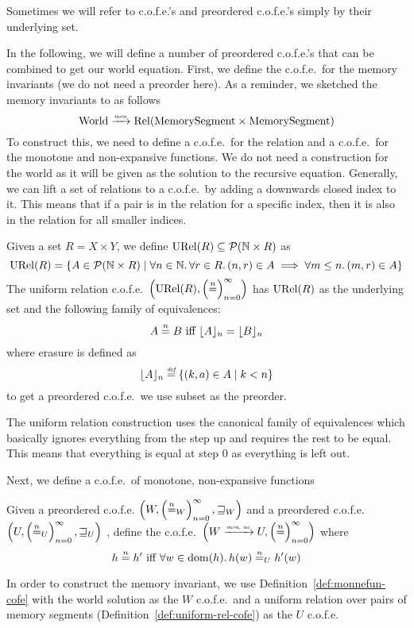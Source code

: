 \begin{jversion}
Sometimes we will refer to c.o.f.e.'s and preordered c.o.f.e.'s simply by their underlying set.

In the following, we will define a number of preordered c.o.f.e.'s that can be combined to get our world equation.
First, we define the c.o.f.e.\ for the memory invariants (we do not need a preorder here).
As a reminder, we sketched the memory invariants to as follows
\[
  \World \monfun \Rel{\MemSeg \times \MemSeg}
\]
To construct this, we need to define a c.o.f.e.\ for the relation and a c.o.f.e.\ for the monotone and non-expansive functions.
We do not need a construction for the world as it will be given as the solution to the recursive equation.
Generally, we can lift a set of relations to a c.o.f.e.\ by adding a downwards closed index to it.
This means that if a pair is in the relation for a specific index, then it is also in the relation for all smaller indices.
\begin{definition}
  \label{def:uniform-rel-cofe}
  Given a set $R = X \times Y$, we define $\URel{R} \subseteq \powerset{\nats \times R}$ as
  \[
    \URel{R} = \{ A \in \powerset{\nats \times R} \mid \forall n \in \nats \ldotp \forall r \in R \ldotp \npair{r} \in A \implies \forall m \leq n \ldotp \npair[m]{r} \in A\}
  \]
  The uniform relation c.o.f.e.\ $\cofe{\URel{R}}$ has $\URel{R}$ as the underlying set and the following family of equivalences:
  \[
    A \nequal B \text{ iff } \erasen{A}{n} = \erasen{B}{n}
  \]
  where erasure is defined as
  \[
    \erasen{A}{n} \defeq \{(k,a) \in A \mid k < n\}
  \]
  to get a preordered c.o.f.e.\ we use subset as the preorder.
\end{definition}
The uniform relation construction uses the canonical family of equivalences which basically ignores everything from the step up and requires the rest to be equal.
This means that everything is equal at step $0$ as everything is left out.

Next, we define a c.o.f.e.\ of monotone, non-expansive functions
\begin{definition}
\label{def:monnefun-cofe}
  Given a preordered c.o.f.e. $\left(W,\left(\nequal[n]_W\right)_{n=0}^{\infty},\future_W\right)$ and a preordered c.o.f.e.\ $\left(U,\left(\nequal[n]_U\right)_{n=0}^{\infty},\future_U\right)$ , define the c.o.f.e.\ $\left(W \monnefun U,\left(\nequal[n]\right)_{n=0}^{\infty}\right)$ where 
  \[
    h \nequal h' \text{ iff } \forall w \in \dom(h) \ldotp h(w) \nequal_U h'(w)
  \]
\end{definition}
In order to construct the memory invariant, we use Definition~\ref{def:monnefun-cofe} with the world solution as the $W$ c.o.f.e.\  and a uniform relation over pairs of memory segments (Definition~\ref{def:uniform-rel-cofe}) as the $U$ c.o.f.e.


\end{jversion}
